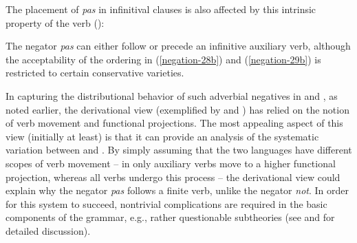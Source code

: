 \documentclass[output=paper
	        ,collection
	        ,collectionchapter
 	        ,biblatex
                ,babelshorthands
                ,newtxmath
                ,draftmode
                ,colorlinks, citecolor=brown
]{langscibook}
\begin{document}
\begin{exe}
\begin{xlist}
\begin{exe}
\begin{xlist}
\eal
{} \label{negation-6a}
 \label{negation-6b}
 \label{negation-6c}
\zl

\noindent
The placement of \textit{pas} in  infinitival
clauses is also affected by this intrinsic property of
the verb (\citealp[]{KS:02}):

\eal
{}
 \label{negation-28b}
\zl

\eal
{}
 \label{negation-29b}
\zl

\noindent
The negator \textit{pas} can either follow or precede an infinitive
auxiliary verb, although the acceptability of the
ordering in (\ref{negation-28b}) and (\ref{negation-29b}) is restricted to certain conservative
varieties.

In capturing the distributional behavior of such adverbial negatives
in  and , as noted earlier, the derivational view (exemplified by \citealt{Pollock:89} and \citealt{Chomsky:91})
has relied on the notion of verb
movement and functional projections.  The most appealing aspect of this
view (initially at least) is that it can provide an analysis of the
systematic variation
between  and . By simply assuming that the
two languages have different scopes of verb movement -- in 
only auxiliary verbs move to a higher functional projection, whereas
all  verbs undergo this process -- the derivational
view could explain why the  negator \textit{pas} follows
a finite verb, unlike the  negator \textit{not}.  In order for this system to succeed,
nontrivial complications are required in the basic components of the
grammar, e.g., rather questionable subtheories (see \citealt[Chapter~3]{Kim:00} and \citealt{KS:02}
for detailed discussion).


\end{xlist}
\end{exe}
\end{xlist}
\end{exe}
\end{document}

